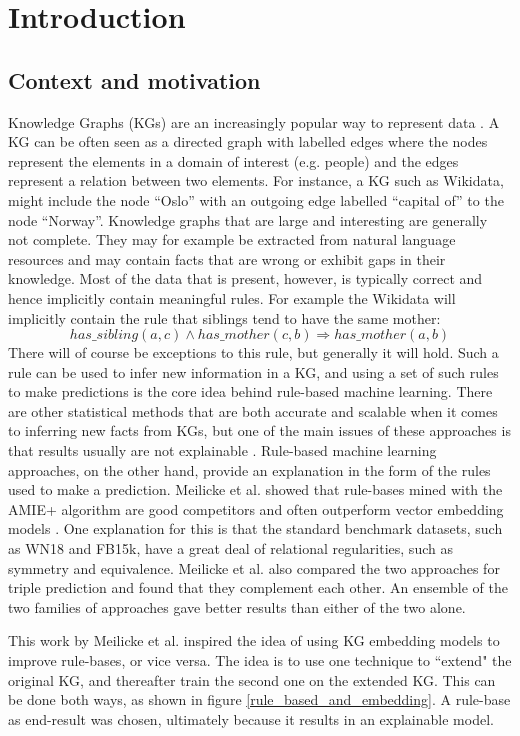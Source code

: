 \chapter{Introduction}
\section{Context and motivation}
Knowledge Graphs (KGs) are an increasingly popular way to represent data \cite{hogan2020knowledge}.
A KG can be often seen as a directed graph with labelled edges where the nodes represent the elements in a domain of interest (e.g. people) and the edges represent a relation between two elements. For instance, a KG such as Wikidata, might include the node ``Oslo'' with an outgoing edge labelled ``capital of'' to the node ``Norway''. Knowledge graphs that are large and interesting are generally not complete. They may for example be extracted from natural language resources and may contain facts that are wrong or exhibit gaps in their knowledge. Most of the data that is present, however, is typically correct and hence implicitly contain meaningful rules. For example the Wikidata will implicitly contain the rule that siblings tend to have the same mother:
\[has\_sibling(a, c) \wedge has\_mother(c, b) \Rightarrow has\_mother(a, b)\]
There will of course be exceptions to this rule, but generally it will hold. Such a rule can be used to infer new information in a KG, and using a set of such rules to make predictions is the core idea behind rule-based machine learning. There are other statistical methods that are both accurate and scalable when it comes to inferring new facts from KGs, but one of the main issues of these approaches is that results usually are not explainable \cite{bonatti2019knowledge}. Rule-based machine learning approaches, on the other hand, provide an explanation in the form of the rules used to make a prediction. Meilicke et al. showed that rule-bases mined with the AMIE+ algorithm are good competitors and often outperform vector embedding models \cite{ensemble}. One explanation for this is that the standard benchmark datasets, such as WN18 and FB15k,  have a great deal of relational regularities, such as symmetry and equivalence. Meilicke et al. also compared the two approaches for triple prediction and found that they complement each other. An ensemble of the two families of approaches gave better results than either of the two alone.

This work by Meilicke et al. inspired the idea of using KG embedding models to improve rule-bases, or vice versa. The idea is to use one technique to ``extend" the original KG, and thereafter train the second one on the extended KG. This can be done both ways, as shown in figure \ref{rule_based_and_embedding}. A rule-base as end-result was chosen, ultimately because it results in an explainable model. 

